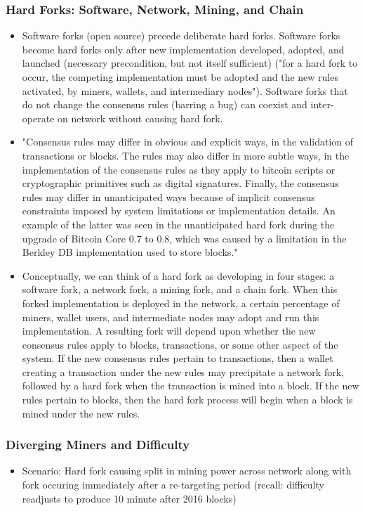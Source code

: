 \documentclass[english, 11pt]{article}
\begin{document}
\subsubsection{Hard Forks: Software, Network, Mining, and Chain}
\begin{itemize}
    \item Software forks (open source) precede deliberate hard forks. Software forks become hard forks only after new implementation developed, adopted, and launched (necessary precondition, but not itself sufficient) ("for a hard fork to occur, the competing implementation must be adopted and the new rules activated, by miners, wallets, and intermediary nodes"). Software forks that do not change the consensus rules (barring a bug) can coexist and inter-operate on network without causing hard fork.
    \item "Consensus rules may differ in obvious and explicit ways, in the validation of transactions or blocks. The rules may also differ in more subtle ways, in the implementation of the consensus rules as they apply to bitcoin scripts or cryptographic primitives such as digital signatures. Finally, the consensus rules may differ in unanticipated ways because of implicit consensus constraints imposed by system limitations or implementation details. An example of the latter was seen in the unanticipated hard fork during the upgrade of Bitcoin Core 0.7 to 0.8, which was caused by a limitation in the Berkley DB implementation used to store blocks." 
    \item Conceptually, we can think of a hard fork as developing in four stages: a software fork, a network fork, a mining fork, and a chain fork. When this forked implementation is deployed in the network, a certain percentage of miners, wallet users, and intermediate nodes may adopt and run this implementation. A resulting fork will depend upon whether the new consensus rules apply to blocks, transactions, or some other aspect of the system. If the new consensus rules pertain to transactions, then a wallet creating a transaction under the new rules may precipitate a network fork, followed by a hard fork when the transaction is mined into a block. If the new rules pertain to blocks, then the hard fork process will begin when a block is mined under the new rules.
\end{itemize}
\subsubsection{Diverging Miners and Difficulty}
\begin{itemize}
    \item Scenario: Hard fork causing split in mining power across network along with fork occuring immediately after a re-targeting period (recall: difficulty readjusts to produce 10 minute after 2016 blocks)
\end{itemize}
\end{document}
